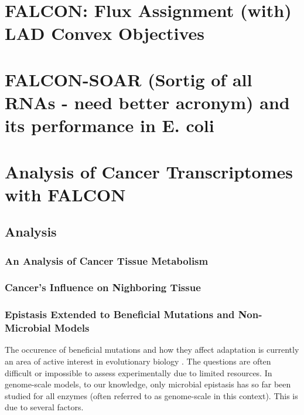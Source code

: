 \documentclass[phd,tocprelim,draft]{cornell}
\newcommand*{\commonDir}{../common/}   %
\begin{document}
\chapter{FALCON: Flux Assignment (with) LAD Convex Objectives}

\falconAbstractMotivation \falconAbstractResults


\chapter{FALCON-SOAR (Sortig of all RNAs - need better acronym) and its performance in E. coli} 


\chapter{Analysis of Cancer Transcriptomes with FALCON}

\section{Analysis}

\subsection{An Analysis of Cancer Tissue Metabolism}
\subsection{Cancer's Influence on Nighboring Tissue}
\subsection{Epistasis Extended to Beneficial Mutations and Non-Microbial Models}

The occurence of beneficial mutations and how they affect adaptation
is currently an area of active interest in evolutionary biology
\cite{Chou2011} \cite{Weinreich2006}. The questions are often
difficult or impossible to assess experimentally due to limited
resources.  In genome-scale models, to our knowledge, only microbial
epistasis has so far been studied for all enzymes (often referred to
as genome-scale in this context). This is due to several factors.
\end{document}
